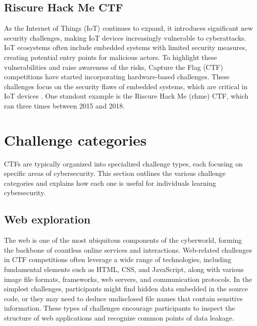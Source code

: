 \documentclass[conference]{IEEEtran}
\begin{document}
\subsection{Riscure Hack Me CTF}

As the Internet of Things (IoT) continues to expand, it introduces significant
new security challenges, making IoT devices increasingly vulnerable to
cyberattacks. IoT ecosystems often include embedded systems with limited
security measures, creating potential entry points for malicious actors. To
highlight these vulnerabilities and raise awareness of the risks, Capture the
Flag (CTF) competitions have started incorporating hardware-based challenges.
These challenges focus on the security flaws of embedded systems, which are
critical in IoT devices \cite{prinetto2020}. %
One standout example is the Riscure Hack Me (rhme) CTF, which ran three times
between 2015 and 2018.



\section{Challenge categories}
\label{sec-challenge-types}

CTFs are typically organized into specialized challenge types, each focusing on
specific areas of cybersecurity. This section outlines the various challenge
categories and explains how each one is useful for individuals learning
cybersecurity.

\subsection{Web exploration}

The web is one of the most ubiquitous components of the cyberworld, forming the
backbone of countless online services and interactions. Web-related challenges
in CTF competitions often leverage a wide range of technologies, including
fundamental elements such as HTML, CSS, and JavaScript, along with various
image file formats, frameworks, web servers, and communication protocols. In
the simplest challenges, participants might find hidden data embedded in the
source code, or they may need to deduce undisclosed file names that
contain sensitive information. These types of challenges encourage participants
to inspect the structure of web applications and recognize common points of
data leakage.
\end{document}
